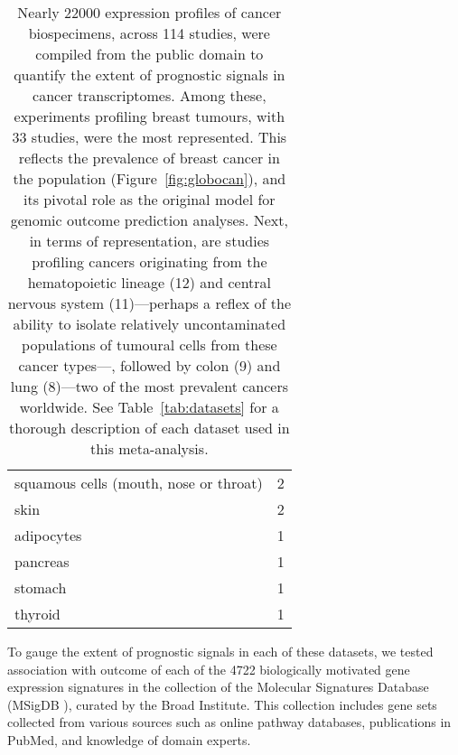 \begin{table}[ht]
\begin{tabular}{lD{.}{.}{-1}}
    squamous cells (mouth, nose or throat) & 2                                            \\
    skin                                   & 2                                            \\
    adipocytes                             & 1                                            \\
    pancreas                               & 1                                            \\
    stomach                                & 1                                            \\
    thyroid                                & 1                                            \\
    \bottomrule
  \end{tabular}
  \caption[Distribution of tissues of origin in the cancers studies probed for
  prognostic signals]{Nearly \num{22000} expression profiles of cancer
    biospecimens, across 114 studies, were compiled from the
    public domain to quantify the extent of prognostic signals in cancer
    transcriptomes.  Among these, experiments profiling breast tumours, with 33
    studies, were the most represented. This reflects the prevalence of breast
    cancer in the population (Figure~\ref{fig:globocan}), and its pivotal
    role as the original model for genomic outcome prediction analyses.  Next, in terms
    of representation, are studies profiling cancers originating from the
    hematopoietic lineage (12) and central nervous system (11)---perhaps a
    reflex of the ability to isolate relatively uncontaminated populations of tumoural cells from
    these cancer types---, followed by colon (9) and lung (8)---two of the most prevalent cancers
    worldwide.  See Table~\ref{tab:datasets} for a thorough description of each dataset used in
    this meta-analysis.}
  \label{tab:cancer-tissues}
\end{table}

To gauge the extent of prognostic signals in each of these datasets, we tested
association with outcome of each of the 4722 biologically motivated gene
expression signatures in the  collection of the Molecular
Signatures Database (MSigDB ), curated by the Broad Institute.
This collection includes gene sets collected from various sources such as online
pathway databases, publications in PubMed, and knowledge of domain experts.

